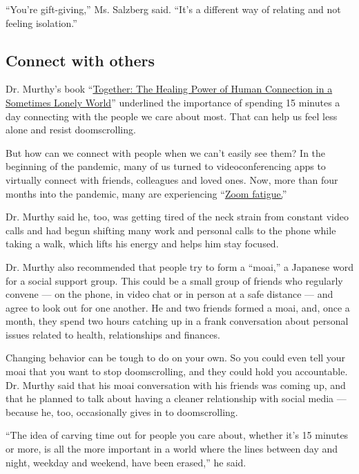 ``You're gift-giving,'' Ms. Salzberg said. ``It's a different way of
relating and not feeling isolation.''

\hypertarget{connect-with-others}{%
\subsection{Connect with others}\label{connect-with-others}}

Dr. Murthy's book
``\href{http://www.harperwave.com/book/9780062913296/Together-Vivek-H.-Murthy-MD/}{Together:
The Healing Power of Human Connection in a Sometimes Lonely World}''
underlined the importance of spending 15 minutes a day connecting with
the people we care about most. That can help us feel less alone and
resist doomscrolling.

But how can we connect with people when we can't easily see them? In the
beginning of the pandemic, many of us turned to videoconferencing apps
to virtually connect with friends, colleagues and loved ones. Now, more
than four months into the pandemic, many are experiencing
``\href{https://www.nytimes3xbfgragh.onion/2020/05/20/smarter-living/coronavirus-zoom-facetime-fatigue.html}{Zoom
fatigue.}''

Dr. Murthy said he, too, was getting tired of the neck strain from
constant video calls and had begun shifting many work and personal calls
to the phone while taking a walk, which lifts his energy and helps him
stay focused.

Dr. Murthy also recommended that people try to form a ``moai,'' a
Japanese word for a social support group. This could be a small group of
friends who regularly convene --- on the phone, in video chat or in
person at a safe distance --- and agree to look out for one another. He
and two friends formed a moai, and, once a month, they spend two hours
catching up in a frank conversation about personal issues related to
health, relationships and finances.

Changing behavior can be tough to do on your own. So you could even tell
your moai that you want to stop doomscrolling, and they could hold you
accountable. Dr. Murthy said that his moai conversation with his friends
was coming up, and that he planned to talk about having a cleaner
relationship with social media --- because he, too, occasionally gives
in to doomscrolling.

``The idea of carving time out for people you care about, whether it's
15 minutes or more, is all the more important in a world where the lines
between day and night, weekday and weekend, have been erased,'' he said.

